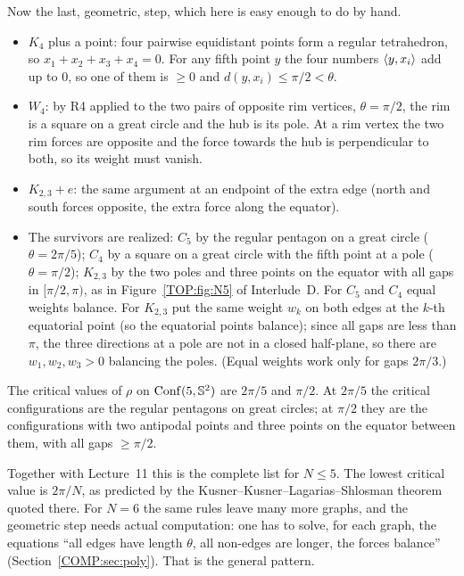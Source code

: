 Now the last, geometric, step, which here is easy enough to do by hand.
\begin{itemize}
\item $K_4$ plus a point: four pairwise equidistant points form a regular tetrahedron, so
  $x_1+x_2+x_3+x_4=0$. For any fifth point $y$ the four numbers $\langle y, x_i\rangle$ add up to $0$, so one of them is
  $\ge0$ and $d(y,x_i)\le\pi/2<\theta$.
\item $W_4$: by R4 applied to the two pairs of opposite rim vertices, $\theta=\pi/2$, the rim is a square on a
  great circle and the hub is its pole. At a rim vertex the two rim forces are opposite and the force
  towards the hub is perpendicular to both, so its weight must vanish.
\item $K_{2,3}+e$: the same argument at an endpoint of the extra edge (north and south forces opposite, the
  extra force along the equator).
\item The survivors are realized: $C_5$ by the regular pentagon on a great circle ($\theta=2\pi/5$); $C_4$
  by a square on a great circle with the fifth point at a pole ($\theta=\pi/2$); $K_{2,3}$ by the two
  poles and three points on the equator with all gaps in $[\pi/2,\pi)$, as in Figure~\ref{TOP:fig:N5} of
  Interlude~D. For $C_5$ and $C_4$ equal weights balance. For $K_{2,3}$ put the same weight $w_k$ on both
  edges at the $k$-th equatorial point (so the equatorial points balance); since all gaps are less than
  $\pi$, the three directions at a pole are not in a closed half-plane, so there are $w_1,w_2,w_3>0$
  balancing the poles. (Equal weights work only for gaps $2\pi/3$.)
\end{itemize}

\begin{proposition}\label{COMP:prop:N5}
The critical values of $\rho$ on $\operatorname{Conf}(5,\mathbb{S}^2)$ are $2\pi/5$ and $\pi/2$. At $2\pi/5$ the critical
configurations are the regular pentagons on great circles; at $\pi/2$ they are the configurations with
two antipodal points and three points on the equator between them, with all gaps $\ge\pi/2$.
\end{proposition}

Together with Lecture~11 this is the complete list for $N\le5$. The lowest critical value is $2\pi/N$,
as predicted by the Kusner--Kusner--Lagarias--Shlosman theorem quoted there. For $N=6$ the same rules
leave many more graphs, and the geometric step needs actual computation: one has to solve, for each
graph, the equations ``all edges have length $\theta$, all non-edges are longer, the forces balance''
(Section~\ref{COMP:sec:poly}). That is the general pattern.

